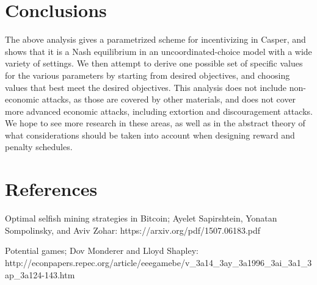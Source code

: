 \documentclass[12pt]{article}
\begin{document}
\section{Conclusions}

The above analysis gives a parametrized scheme for incentivizing in Casper, and shows that it is a Nash equilibrium in an uncoordinated-choice model with a wide variety of settings. We then attempt to derive one possible set of specific values for the various parameters by starting from desired objectives, and choosing values that best meet the desired objectives. This analysis does not include non-economic attacks, as those are covered by other materials, and does not cover more advanced economic attacks, including extortion and discouragement attacks. We hope to see more research in these areas, as well as in the abstract theory of what considerations should be taken into account when designing reward and penalty schedules.

\section{References}


Optimal selfish mining strategies in Bitcoin; Ayelet Sapirshtein, Yonatan Sompolinsky, and Aviv Zohar: https://arxiv.org/pdf/1507.06183.pdf

Potential games; Dov Monderer and Lloyd Shapley: http://econpapers.repec.org/article/eeegamebe/v_3a14_3ay_3a1996_3ai_3a1_3ap_3a124-143.htm
\end{document}
